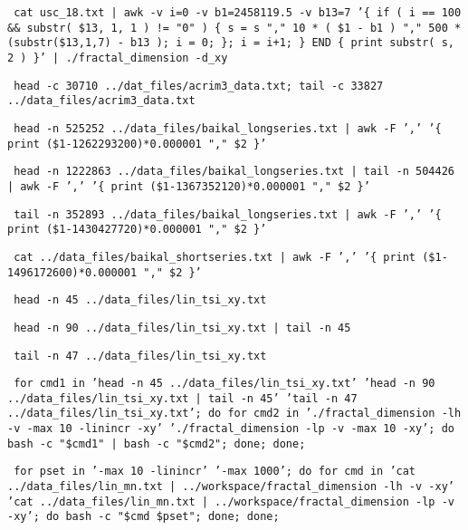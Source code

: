\documentclass[a4paper]{article}
\begin{document}
\texttt{\small{ cat usc\_18.txt | awk -v i=0 -v b1=2458119.5 -v b13=7 '\{ if ( i == 100 \&\& substr( \$13, 1, 1 ) != "0" ) \{ s = s "," 10 * ( \$1 - b1 ) "," 500 * (substr(\$13,1,7) - b13 ); i = 0; \}; i = i+1; \} END \{ print substr( s, 2 ) \}' | ./fractal\_dimension -d\_xy }}



\texttt{\small{ head -c 30710 ../dat\_files/acrim3\_data.txt; tail -c 33827 ../data\_files/acrim3\_data.txt } }

\texttt{\small{ head -n 525252 ../data\_files/baikal\_longseries.txt |   awk -F ',' '\{ print (\$1-1262293200)*0.000001 "," \$2 \}' } }

\texttt{\small{ head -n 1222863 ../data\_files/baikal\_longseries.txt | tail -n 504426 |  awk -F ',' '\{ print (\$1-1367352120)*0.000001 "," \$2 \}' } }

\texttt{\small{ tail -n 352893 ../data\_files/baikal\_longseries.txt |  awk -F ',' '\{ print (\$1-1430427720)*0.000001 "," \$2 \}' } }

\texttt{\small{ cat ../data\_files/baikal\_shortseries.txt |  awk -F ',' '\{ print (\$1-1496172600)*0.000001 "," \$2 \}' } }

\texttt{\small{ head -n 45 ../data\_files/lin\_tsi\_xy.txt } }

\texttt{\small{ head -n 90 ../data\_files/lin\_tsi\_xy.txt | tail -n 45 } }

\texttt{\small{ tail -n 47 ../data\_files/lin\_tsi\_xy.txt } }

\texttt{\small{ for cmd1 in 'head -n 45 ../data\_files/lin\_tsi\_xy.txt' 'head -n 90 ../data\_files/lin\_tsi\_xy.txt | tail -n 45' 'tail -n 47 ../data\_files/lin\_tsi\_xy.txt'; do for cmd2 in './fractal\_dimension -lh -v -max 10 -linincr -xy' './fractal\_dimension -lp -v -max 10 -xy'; do bash -c "\$cmd1" | bash -c "\$cmd2"; done; done; } }

\texttt{\small{ for pset in '-max 10 -linincr' '-max 1000'; do for cmd in 'cat ../data\_files/lin\_mn.txt | ../workspace/fractal\_dimension -lh -v -xy' 'cat ../data\_files/lin\_mn.txt | ../workspace/fractal\_dimension -lp -v -xy'; do bash -c "\$cmd \$pset"; done; done; } }

\end{document}
